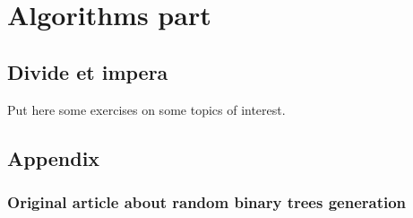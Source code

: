 \documentclass[twoside,openright,titlepage,fleqn,
	headinclude,11pt,a4paper,BCOR5mm,footinclude
	]{scrbook}
\begin{document}
\part{Algorithms part}

\chapter{Divide et impera}
Put here some exercises on some topics of interest.

\chapter{Appendix}

\section{Original article about random binary trees generation}



% 

% 
\end{document}
